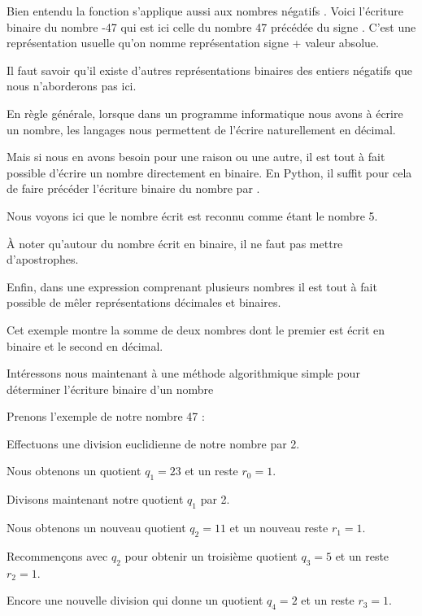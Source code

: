 \change
Bien entendu la  fonction  s'applique aussi aux nombres négatifs
. Voici l'écriture binaire du nombre -47 qui est ici celle du nombre 47 précédée du signe \codeinline{-}. C'est une représentation usuelle qu'on nomme représentation signe + valeur absolue.

Il faut savoir qu'il existe d'autres représentations binaires des entiers négatifs que nous n'aborderons pas ici.

\change

En règle générale, lorsque dans un programme informatique nous avons à écrire un nombre, les langages nous permettent de l'écrire naturellement en décimal.

Mais si nous en avons besoin pour une raison ou une autre, il est tout à fait possible d'écrire un nombre directement en binaire. En Python, il suffit pour cela de faire précéder l'écriture binaire du nombre par .

Nous voyons ici que le nombre écrit  est reconnu comme étant le nombre 5.

À noter qu'autour du nombre écrit en binaire, il ne faut pas mettre d'apostrophes.

\change

Enfin, dans une expression comprenant plusieurs nombres il est tout à fait possible de mêler représentations décimales et binaires.

Cet exemple montre la somme de deux nombres dont le premier est écrit en binaire et le second en décimal.

\diapo %

Intéressons nous maintenant à une méthode algorithmique simple pour déterminer l'écriture binaire d'un nombre

\change
Prenons l'exemple de notre nombre 47 :

\change
Effectuons une division euclidienne de notre nombre par 2.

Nous obtenons un quotient $q_1=23$ et un reste $r_0=1$.

\change
Divisons maintenant notre quotient $q_1$ par 2.

Nous obtenons un nouveau quotient $q_2=11$ et un nouveau reste $r_1=1$.

\change
Recommençons avec $q_2$ pour obtenir un troisième quotient $q_3=5$ et un reste $r_2=1$.

\change
Encore une nouvelle division qui donne un quotient $q_4=2$ et un reste $r_3=1$.

